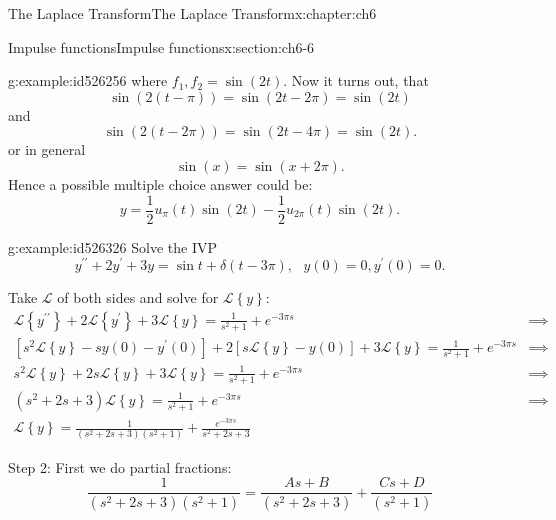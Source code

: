 \documentclass[oneside,10pt,]{book}
\numberwithin{equation}{section}
\numberwithin{equation}{section}
\newcommand{\amp}{&}
\begin{document}
\begin{chapterptx}{The Laplace Transform}{}{The Laplace Transform}{}{}{x:chapter:ch6}
\begin{sectionptx}{Impulse functions}{}{Impulse functions}{}{}{x:section:ch6-6}
\begin{example}{}{g:example:id526256}
where \(f_{1},f_{2}=\sin(2t)\). Now it turns out, that%
\begin{equation*}
\sin\left(2\left(t-\pi\right)\right)=\sin\left(2t-2\pi\right)=\sin(2t)
\end{equation*}
and%
\begin{equation*}
\sin\left(2\left(t-2\pi\right)\right)=\sin\left(2t-4\pi\right)=\sin(2t).
\end{equation*}
or in general%
\begin{equation*}
\sin\left(x\right)=\sin\left(x+2\pi\right).
\end{equation*}
Hence a possible multiple choice answer could be:%
\begin{equation*}
y=\frac{1}{2}u_{\pi}(t)\sin\left(2t\right)-\frac{1}{2}u_{2\pi}(t)\sin\left(2t\right).
\end{equation*}
%
\end{example}
\begin{example}{}{g:example:id526326}%
Solve the IVP%
\begin{equation*}
y^{\prime\prime}+2y^{\prime}+3y=\sin t+\delta\left(t-3\pi\right),\,\,\,\,y(0)=0,y^{\prime}(0)=0.
\end{equation*}
%
\par
Take \(\mathcal{L}\) of both sides and solve for \(\mathcal{L}\left\{ y\right\} \):%
\begin{align*}
\mathcal{L}\left\{ y^{\prime\prime}\right\} +2\mathcal{L}\left\{ y^{\prime}\right\} +3\mathcal{L}\left\{ y\right\} =\frac{1}{s^{2}+1}+e^{-3\pi s} \amp \implies\\
\left[s^{2}\mathcal{L}\left\{ y\right\} -sy(0)-y^{\prime}(0)\right]+2\left[s\mathcal{L}\left\{ y\right\} -y(0)\right]+3\mathcal{L}\left\{ y\right\} =\frac{1}{s^{2}+1}+e^{-3\pi s} \amp \implies\\
s^{2}\mathcal{L}\left\{ y\right\} +2s\mathcal{L}\left\{ y\right\} +3\mathcal{L}\left\{ y\right\} =\frac{1}{s^{2}+1}+e^{-3\pi s} \amp \implies\\
\left(s^{2}+2s+3\right)\mathcal{L}\left\{ y\right\} =\frac{1}{s^{2}+1}+e^{-3\pi s} \amp \implies\\
\mathcal{L}\left\{ y\right\} =\frac{1}{\left(s^{2}+2s+3\right)\left(s^{2}+1\right)}+\frac{e^{-3\pi s}}{s^{2}+2s+3}
\end{align*}
%
\par
Step 2: First we do partial fractions:%
\begin{equation*}
\frac{1}{\left(s^{2}+2s+3\right)\left(s^{2}+1\right)}=\frac{As+B}{\left(s^{2}+2s+3\right)}+\frac{Cs+D}{\left(s^{2}+1\right)}

\end{equation*}
\end{example}
\end{sectionptx}
\end{chapterptx}
\end{document}
